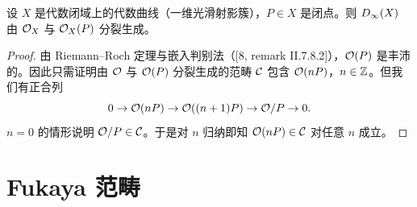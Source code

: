 

\begin{theorem}\label{thm:3.3}
设 $X$ 是代数闭域上的代数曲线（一维光滑射影簇），$P\in X$ 是闭点。则 $D_\infty(X)$ 由 $\mathcal{O}_X$ 与 $\mathcal{O}_X(P)$ 分裂生成。
\end{theorem}

\begin{proof}
由 Riemann–Roch 定理与嵌入判别法（[8, remark II.7.8.2]），$\mathcal{O}(P)$ 是丰沛的。因此只需证明由 $\mathcal{O}$ 与 $\mathcal{O}(P)$ 分裂生成的范畴 $\mathcal{C}$ 包含 $\mathcal{O}(nP)$，$n\in\mathbb{Z}$。但我们有正合列
\[
  0 \to \mathcal{O}(nP) \to \mathcal{O}((n+1)P) \to \mathcal{O}/P \to 0 .
\]
$n=0$ 的情形说明 $\mathcal{O}/P\in\mathcal{C}$。于是对 $n$ 归纳即知 $\mathcal{O}(nP)\in\mathcal{C}$ 对任意 $n$ 成立。
\end{proof}


\section{Fukaya 范畴}
\label{sec:fukaya}


